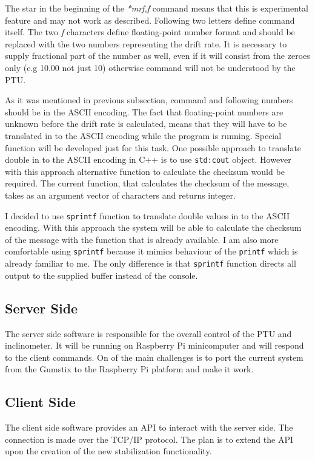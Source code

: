 The star in the beginning of the \textit{*mrf,f} command means that this is experimental feature and may not work as described. Following two letters define command itself. The two \textit{f} characters define floating-point number format and should be replaced with the two numbers representing the drift rate. It is necessary to supply fractional part of the number as well, even if it will consist from the zeroes only (e.g 10.00 not just 10) otherwise command will not be understood by the PTU. 

As it was mentioned in previous subsection, command and following numbers should be in the ASCII encoding. The fact that floating-point numbers are unknown before the drift rate is calculated, means that they will have to be translated in to the ASCII encoding while the program is running. Special function will be developed just for this task. One possible approach to translate double in to the ASCII encoding in C++ is to use \texttt{std:cout} object. However with this approach alternative function to calculate the checksum would be required. The current function, that calculates the checksum of the message, takes as an argument vector of characters and returns integer. 

I decided to use \texttt{sprintf} function to translate double values in to the ASCII encoding. With this approach the system will be able to calculate the checksum of the message with the function that is already available. I am also more comfortable using \texttt{sprintf} because it mimics behaviour of the \texttt{printf} which is already familiar to me. The only difference is that \texttt{sprintf} function directs all output to the supplied buffer instead of the console. 

\subsection{Server Side}
The server side software is responsible for the overall control of the PTU and inclinometer. It will be running on Raspberry Pi minicomputer and will respond to the client commands. On of the main challenges is to port the current system from the Gumstix to the Raspberry Pi platform and make it work. 

\subsection{Client Side}
The client side software provides an API to interact with the server side. The connection is made over the TCP/IP protocol. The plan is to extend the API upon the creation of the new stabilization functionality. 

